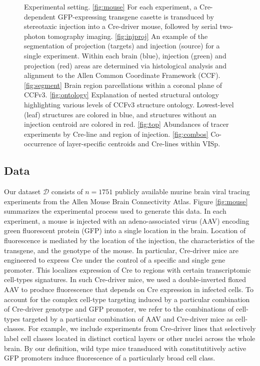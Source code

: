 \begin{figure}[H]
    \caption{Experimental setting.  \ref{fig:mouse}  For each experiment, a Cre-dependent GFP-expressing transgene casette is transduced by stereotaxic injection into a Cre-driver mouse, followed by serial two-photon tomography imaging.
    \ref{fig:injproj} An example of the segmentation of projection (targets) and injection (source) for a single experiment. Within each brain (blue), injection (green) and projection (red) areas are determined via histological analysis and alignment to the Allen Common Coordinate Framework (CCF).
    \ref{fig:segment} Brain region parcellations within a coronal plane of CCFv3. \ref{fig:ontology} Explanation of nested structural ontology highlighting various levels of CCFv3 structure ontology.
    Lowest-level (leaf) structures are colored in blue, and structures without an injection centroid are colored in red.
    \ref{fig:top}  Abundances of tracer experiments by Cre-line and region of injection. \ref{fig:combos}  Co-occurrence of layer-specific centroids and Cre-lines within VISp.}
    \label{fig:data}
\end{figure}

\newpage

\subsection{Data}

Our dataset $\mathcal D$ consists of $n=1751$ publicly available murine brain viral tracing experiments from the Allen Mouse Brain Connectivity Atlas.
Figure \ref{fig:mouse} summarizes the experimental process used to generate this data.
In each experiment, a mouse is injected with an adeno-associated virus (AAV) encoding green fluorescent protein (GFP) into a single location in the brain.
Location of fluorescence is mediated by the location of the injection, the characteristics of the transgene, and the genotype of the mouse.
In particular, Cre-driver mice are engineered to express Cre under the control of a specific and single gene promoter.
This localizes expression of Cre to regions with certain transcriptomic cell-types signatures.
In such Cre-driver mice, we used a double-inverted floxed AAV to produce fluorescence that depends on Cre expression in infected cells.
To account for the complex cell-type targeting induced by a particular combination of Cre-driver genotype and GFP promoter, we refer to the combinations of cell-types targeted by a particular combination of AAV and Cre-driver mice as cell-classes.
For example, we include experiments from Cre-driver lines that selectively label cell classes located in distinct cortical layers or other nuclei across the whole brain.
By our definition, wild type mice transduced with constitutitively active GFP promoters induce fluorescence of a particularly broad cell class.

